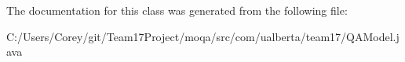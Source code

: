 The documentation for this class was generated from the following file\+:\begin{DoxyCompactItemize}
\item 
C\+:/\+Users/\+Corey/git/\+Team17\+Project/moqa/src/com/ualberta/team17/Q\+A\+Model.\+java\end{DoxyCompactItemize}
